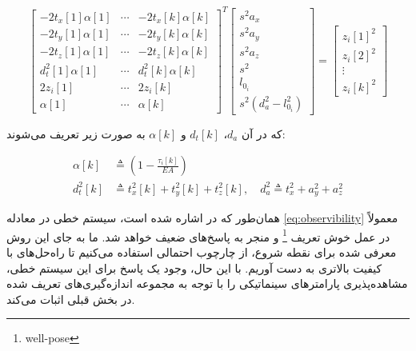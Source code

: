\begin{equation}\label{eq:observibility}
	\begin{bmatrix}
		-2t_x[1]\alpha[1] & \cdots & -2t_x[k]\alpha[k] \\
		-2t_y[1]\alpha[1] & \cdots & -2t_y[k]\alpha[k] \\
		-2t_z[1]\alpha[1] & \cdots & -2t_z[k]\alpha[k] \\
		d^2_t[1]\alpha[1] & \cdots & d^2_t[k]\alpha[k] \\
		2z_i[1] & \cdots & 2z_i[k] \\
		\alpha[1] & \cdots & \alpha[k]
	\end{bmatrix}^T
	\begin{bmatrix}
		s^2 a_x \\
		s^2 a_y \\
		s^2 a_z \\
		s^2 \\
		l_{0_i} \\
		s^2 (d^2_a - l_{0_i}^2)
	\end{bmatrix}
	=
	\begin{bmatrix}
		z_i[1]^2 \\
		z_i[2]^2 \\
		\vdots \\
		z_i[k]^2
	\end{bmatrix}
\end{equation}

که در آن \( d_a \)، \( d_t[k] \) و \( \alpha[k] \) به صورت زیر تعریف می‌شوند:


\begin{equation}
	\begin{split}
		\alpha[k] &\triangleq \left(1 - \frac{\tau_i[k]}{EA}\right) \\
		d^2_t[k] &\triangleq t^2_x[k] + t^2_y[k] + t^2_z[k], \quad d^2_a \triangleq t^2_x + a^2_y + a^2_z
	\end{split}
\end{equation}

همان‌طور که در 
\cite{blueml2021bias}
اشاره شده است، سیستم خطی در معادله 
\ref{eq:observibility}
معمولاً در عمل خوش تعریف
\footnote{well-pose}
و منجر به پاسخ‌های ضعیف خواهد شد. ما به جای این روش معرفی شده برای نقطه شروع، از چارچوب احتمالی استفاده می‌کنیم تا راه‌حل‌های با کیفیت بالاتری به دست آوریم. با این حال، وجود یک پاسخ برای این سیستم خطی، مشاهده‌پذیری پارامترهای سینماتیکی را با توجه به مجموعه اندازه‌گیری‌های تعریف شده در بخش قبلی اثبات می‌کند.










